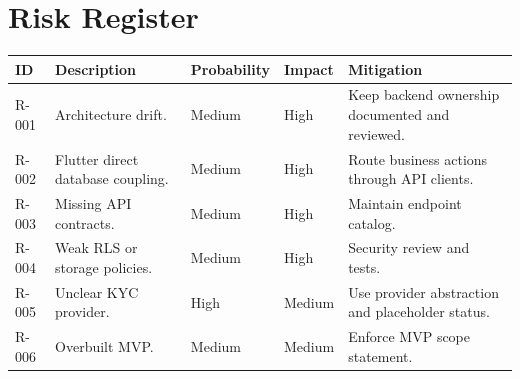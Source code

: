\chapter{Risk Register}
\begin{longtable}{p{}p{}p{}p{}p{}}
\toprule
ID & Description & Probability & Impact & Mitigation \\
\midrule
R-001 & Architecture drift. & Medium & High & Keep backend ownership documented and reviewed. \\
R-002 & Flutter direct database coupling. & Medium & High & Route business actions through API clients. \\
R-003 & Missing API contracts. & Medium & High & Maintain endpoint catalog. \\
R-004 & Weak RLS or storage policies. & Medium & High & Security review and tests. \\
R-005 & Unclear KYC provider. & High & Medium & Use provider abstraction and placeholder status. \\
R-006 & Overbuilt MVP. & Medium & Medium & Enforce MVP scope statement. \\
\bottomrule
\end{longtable}
